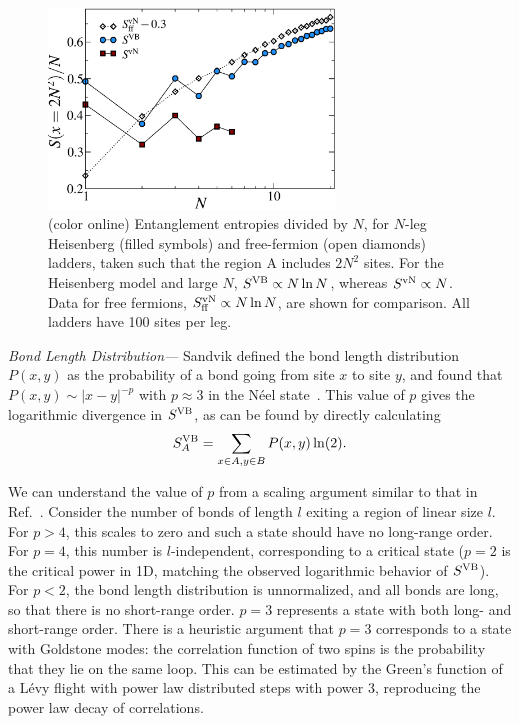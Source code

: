 \documentclass[prl,aps,twocolumn,floatfix,amsmath,amssymb,superscriptaddress,tightenlines]{revtex4}
\begin{document}
\begin{figure} { \includegraphics[width=3in]{fig4.eps} \caption{(color
online) Entanglement entropies divided by $N$,  for $N$-leg Heisenberg
(filled symbols) and free-fermion (open diamonds) ladders, taken such that
the region A includes $2N^2$ sites.  
%
For the Heisenberg model and large $N$, $S^{\rm VB}\propto N \ln N$,
whereas $S^{\rm vN}\propto N$.  
Data for free fermions, $S^{\rm vN}_{\rm ff}\propto N \ln N$,  are shown for comparison.
%
All ladders have 100 sites per leg.  \label{zigzag}}} \end{figure}

{\it Bond Length Distribution---} Sandvik defined the bond length
distribution $P(x,y)$ as the probability of a bond going from site $x$ to
site $y$, and found that $P(x,y)\sim |x-y|^{-p}$ with $p\approx 3$ in the
N\'eel state~\cite{Sandvik}.  This value of $p$ gives the logarithmic
divergence in $S^{\rm VB}$, as can be found by directly calculating
\begin{equation} 
S^{\rm VB}_{A}=\sum_{x\in A,y\in B} P(x,y)\ln (2).
\end{equation}


We can understand the value of $p$ from a scaling argument similar to that
in Ref.~\cite{network}.
Consider the number of bonds of length $l$ exiting a region of linear size $l$.  For $p>4$, this
scales to zero and such a state should have no long-range order.
For $p=4$, this number is $l$-independent, corresponding to a critical
state ($p=2$ is the critical power in 1D, matching the
observed logarithmic behavior of $S^{\rm VB}$).
For $p<2$, the bond length distribution is unnormalized, and all bonds are long, so that
there is no short-range order.  $p=3$ represents a state with both long-
and short-range order.  There is a heuristic argument that $p=3$ corresponds to a state
with Goldstone modes: the correlation function of two spins is the
probability that they lie on the same loop.  This can be
estimated by
the Green's function of a L{\'e}vy flight with power law distributed steps with power $3$,
reproducing the power law decay of correlations.
\end{document}
